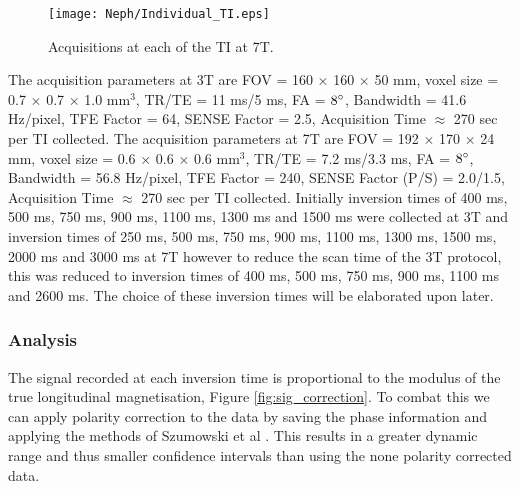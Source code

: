 \begin{figure}[H]
	\centering
	\texttt{[image: Neph/Individual\_TI.eps]}
	\caption{Acquisitions at each of the \ac{TI} at 7T.}
	\label{fig:inversion_recovery_data}	
\end{figure}

The acquisition parameters at 3T are \ac{FOV} = 160 $\times$ 160 $\times$ 50 mm, voxel size = 0.7 $\times$ 0.7 $\times$ 1.0 mm$^3$, \ac{TR}/\ac{TE} = 11 ms/5 ms, \ac{FA} = $8\degree$, Bandwidth = 41.6 Hz/pixel, \ac{TFE} Factor = 64, \ac{SENSE} Factor = 2.5, Acquisition Time $\approx$ 270 sec per \ac{TI} collected. The acquisition parameters at 7T are \ac{FOV} = 192 $\times$ 170 $\times$ 24 mm, voxel size = 0.6 $\times$ 0.6 $\times$ 0.6 mm$^3$, \ac{TR}/\ac{TE} = 7.2 ms/3.3 ms, \ac{FA} = $8\degree$, Bandwidth = 56.8 Hz/pixel, \ac{TFE} Factor = 240, \ac{SENSE} Factor (P/S) = 2.0/1.5, Acquisition Time $\approx$ 270 sec per \ac{TI} collected. Initially inversion times of 400 ms, 500 ms, 750 ms, 900 ms, 1100 ms, 1300 ms and 1500 ms were collected at 3T and inversion times of 250 ms, 500 ms, 750 ms, 900 ms, 1100 ms, 1300 ms, 1500 ms, 2000 ms and 3000 ms at 7T however to reduce the scan time of the 3T protocol, this was reduced to inversion times of 400 ms, 500 ms, 750 ms, 900 ms, 1100 ms and 2600 ms. The choice of these inversion times will be elaborated upon later.
\subsubsection{Analysis}

The signal recorded at each inversion time is proportional to the modulus of the true longitudinal magnetisation, Figure \ref{fig:sig_correction}. 
To combat this we can apply polarity correction to the data by saving the phase information and applying the methods of Szumowski et al \cite{szumowski_signal_2012}. This results in a greater dynamic range and thus smaller confidence intervals than using the none polarity corrected data.\\


